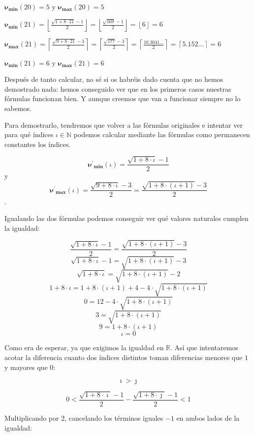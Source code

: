 \documentclass{amsart}
\theoremstyle{definition}
\theoremstyle{remark}
\numberwithin{equation}{section}
\newcommand{\setR}{\mathds R}
\newcommand{\setN}{\mathds N}
\newcommand{\monrel}[1]{\mathbf{#1}}
\newcommand{\funct}[1]{\monrel{#1}}
\newcommand{\functat}[2]{\funct{#1}{\left({#2}\right)}}
\begin{document}
$\functat{{\nu}_{\min}}{20} = 5$ y $\functat{{\nu}_{\max}}{20} = 5$


$\functat{{\nu}_{\min}}{21} =
\left\lfloor\frac{\sqrt{1+8 \cdot 21}-1}{2}\right\rfloor =
\left\lfloor\frac{\sqrt{169}-1}{2}\right\rfloor =
\left\lfloor{6}\right\rfloor = 6
$


$\functat{{\nu}_{\max}}{21} =
\left\lceil\frac{\sqrt{9+8\cdot 21}-3}{2}\right\rceil =
\left\lceil\frac{\sqrt{177}-3}{2}\right\rceil =
\left\lceil\frac{10.3041...}{2}\right\rceil =
\left\lceil{5.152...}\right\rceil = 6
$


$\functat{{\nu}_{\min}}{21} = 6$ y $\functat{{\nu}_{\max}}{21} = 6$


	Después de tanto calcular, no sé si os habréis dado cuenta que no hemos
demostrado nada: hemos conseguido ver que en los primeros casos nuestras
fórmulas funcionan bien. Y aunque creemos que van a funcionar siempre no lo
sabemos.


	Para demostrarlo, tendremos que volver a las fórmulas originales e
intentar ver para qué índices $\iota \in \setN$ podemos calcular mediante las
fórmulas como permanecen constantes los índices.


$$
\functat{{\nu^\prime}_{\min}}{\iota} =
\frac{\sqrt{1+8\cdot\iota}-1}{2}
$$ y 
$$
\functat{{\nu^\prime}_{\max}}{\iota} =
\frac{\sqrt{9+8\cdot\iota}-3}{2} =
\frac{\sqrt{1+8\cdot\left(\iota + 1\right)}-3}{2}
$$.


	Igualando las dos fórmulas podemos conseguir ver qué valores naturales
cumplen la igualdad:


$$
\frac{\sqrt{1+8\cdot\iota}-1}{2} =
\frac{\sqrt{1+8\cdot\left(\iota + 1\right)}-3}{2}
$$
$$
\sqrt{1+8\cdot\iota}-1 =
\sqrt{1+8\cdot\left(\iota + 1\right)}-3
$$
$$
\sqrt{1+8\cdot\iota} =
\sqrt{1+8\cdot\left(\iota + 1\right)}-2
$$
$$
{1+8\cdot\iota} = {1+8\cdot\left(\iota + 1\right)} + 4 - 4 \cdot
\sqrt{1+8\cdot\left(\iota + 1\right)}
$$
$$
0 = 12 - 4 \cdot \sqrt{1+8\cdot\left(\iota + 1\right)}
$$
$$
3 = \sqrt{1+8\cdot\left(\iota + 1\right)}
$$
$$
9 = {1+8\cdot\left(\iota + 1\right)}
$$
$$
\iota = 0
$$


	Como era de esperar, ya que exigimos la igualdad en $\setR$. Así que
intentaremos acotar la diferencia cuanto dos índices distintos toman
diferencias menores que $1$ y mayores que $0$:


$$
\imath > \jmath
$$


$$
0 < 
    \frac{\sqrt{1+8\cdot\imath}-1}{2}
    -
    \frac{\sqrt{1+8\cdot\jmath}-1}{2}
< 1
$$


	Multiplicando por $2$, cancelando los términos iguales $-1$ en ambos lados de la igualdad:
\end{document}
